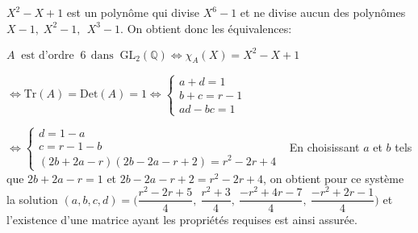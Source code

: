 $X^2-X +1$ est un polynôme qui divise $X^6-1$ et ne divise aucun des polynômes $X-1,\;X^2-1,\:\:X^3-1.$ On  obtient  donc les équivalences:
 
$A\:\text{  est d'ordre }\:6 \:\: \text {dans }\:\mathrm{GL}_2 (\mathbb Q)   \iff  \chi _A (X) = X^2-X+1$ 

$\iff \text{Tr}(A) = \text{Det}(A) =1  \iff \left\{ \begin {array} {l} a+d = 1\\b+c = r-1 \\ ad -bc =1 \end{array} \right.$

$ \iff \left\{ \begin{array} {l} d=1-a\\ c= r-1-b\\ (2b+2a-r)(2b-2a -r+2) = r^2-2r +4 \end{array} \right.\:\:$ 
En choisissant $a$ et $b$ tels que $2b+2a-r =1$ et $2b-2a -r+2 = r^2-2r+4$, on obtient pour ce système la solution
 $(a,b,c,d) =\Big( \dfrac{r^2-2r+5}4 ,\: \dfrac {r^2+3}4,\: \dfrac{-r^2+4r-7}4,\:\dfrac {-r^2+2r-1}4 \Big)$  et l'existence d'une matrice ayant les propriétés requises est ainsi assurée.
